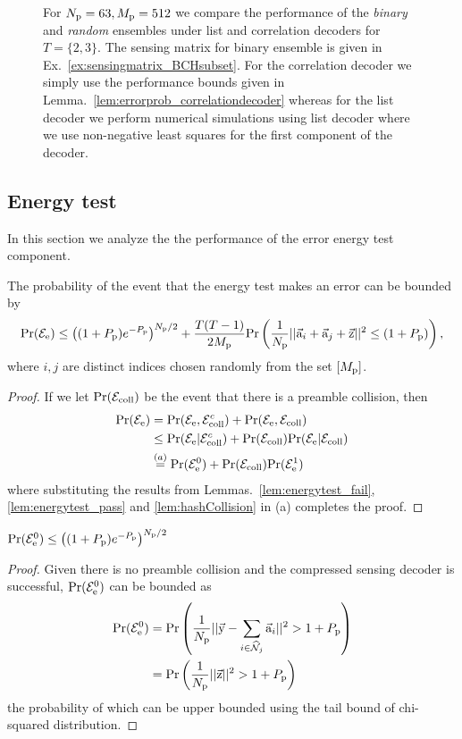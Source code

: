 \begin{figure}[!ht]
  \centering
  \resizebox{0.75\textwidth}{!}{}
  \caption{For $N_{\mathrm{p}}=63, M_{\mathrm{p}}=512$ we compare the performance of the \emph{binary} and \emph{random} ensembles under list and correlation decoders for $T=\{2,3\}$. The sensing matrix for binary ensemble is given in Ex.~\ref{ex:sensingmatrix_BCHsubset}. For the correlation decoder we simply use the performance bounds given in Lemma.~\ref{lem:errorprob_correlationdecoder} whereas for the list decoder we perform numerical simulations using list decoder where we use non-negative least squares for the first component of the decoder.}
  \label{fig:cscomparison}
\end{figure}
%

\subsection{Energy test}
In this section we analyze the the performance of the error energy test component.
\begin{lemma}
\label{lem:energytest_overallerror}
The probability of the event that the energy test makes an error can be bounded by
\[
\mathrm{Pr}(\mathcal{E}_{\mathrm{e}})\leq  \left((1+P_{\mathrm{p}})e^{-P_{\mathrm{p}}}\right)^{N_{\mathrm{p}}/2} + \frac{T(T-1)}{2M_\mathrm{p}} \mathrm{Pr}\left( \frac{1}{N_{\mathrm{p}}}||\vec{\mathrm{a}}_i+\vec{\mathrm{a}}_j+\vec{\mathrm{z}}||^2\leq (1+P_{\mathrm{p}})\right),
\]
where $i,j$ are distinct indices chosen randomly from the set $[M_{\mathrm{p}}]$.
\end{lemma}
\begin{proof}
If we let $\mathrm{Pr}(\mathcal{E}_{\text{coll}})$ be the event that there is a preamble collision, then
\begin{align*}
\mathrm{Pr}(\mathcal{E}_{\mathrm{e}})&=\mathrm{Pr}(\mathcal{E}_{\mathrm{e}},\mathcal{E}_{\text{coll}}^c)+\mathrm{Pr}(\mathcal{E}_{\mathrm{e}},\mathcal{E}_{\text{coll}})\\
&\leq \mathrm{Pr}(\mathcal{E}_{\mathrm{e}}|\mathcal{E}_{\text{coll}}^c)+\mathrm{Pr}(\mathcal{E}_{\text{coll}})\mathrm{Pr}(\mathcal{E}_{\mathrm{e}}|\mathcal{E}_{\text{coll}})\\
&\stackrel{(a)}{=}\mathrm{Pr}(\mathcal{E}_{\mathrm{e}}^0)+\mathrm{Pr}(\mathcal{E}_{\text{coll}}) \mathrm{Pr}(\mathcal{E}_{\mathrm{e}}^1) 
\end{align*}
where substituting the results from Lemmas.~\ref{lem:energytest_fail}, \ref{lem:energytest_pass} and \ref{lem:hashCollision} in (a) completes the proof.
\end{proof}

\begin{lemma}
\label{lem:energytest_fail}
$\mathrm{Pr}(\mathcal{E}_{\mathrm{e}}^0)\leq \left((1+P_{\mathrm{p}})e^{-P_{\mathrm{p}}}\right)^{N_{\mathrm{p}}/2}$
\end{lemma}
\begin{proof}
Given there is no preamble collision and the compressed sensing decoder is successful, $\mathrm{Pr}(\mathcal{E}_{\mathrm{e}}^0)$ can be bounded as
\begin{align*}
\mathrm{Pr}(\mathcal{E}_{\mathrm{e}}^0)&=\mathrm{Pr}\left(\frac{1}{N_{\mathrm{p}}}||\vec{\mathrm{y}}-\sum_{i\in\widehat{\mathcal{N}}_j}\vec{\mathrm{a}}_i||^2 >1+P_{\mathrm{p}}\right)\\
&=\mathrm{Pr}\left(\frac{1}{N_{\mathrm{p}}}||\vec{\mathrm{z}}||^2 >1+P_{\mathrm{p}}\right)
\end{align*}
the probability of which can be upper bounded using the tail bound of chi-squared distribution.
\end{proof}

